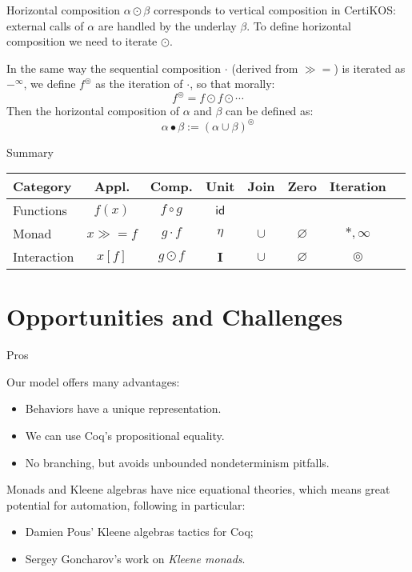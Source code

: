 \documentclass{beamer}
\newcommand{\bind}{\gg\!\!=}
\begin{document}
\begin{frame}{Horizontal composition} %
$\alpha \odot \beta$ corresponds to vertical composition in CertiKOS:
external calls of $\alpha$ are handled by the underlay $\beta$.
To define horizontal composition we need to iterate $\odot$.
\vfill

In the same way the sequential composition $\cdot$ (derived from $\bind$)
is iterated as $-^\infty$,
we define $f^\circledcirc$ as the iteration of $\cdot$,
so that morally:
\[
    f^\circledcirc = f \odot f \odot \cdots
\]
Then the horizontal composition of $\alpha$ and $\beta$
can be defined as:
\[ \alpha \bullet \beta := (\alpha \cup \beta)^\circledcirc \]
\vfill

\end{frame}

\begin{frame}{Summary} %

  \begin{center}
    \begin{tabular}{lccccccc}
      \hline
      Category & Appl. & Comp. & Unit & Join & Zero & Iteration \\
      \hline
      Functions & $f(x)$ & $f \circ g$ & $\mathsf{id}$ & & \\
      Monad &
        $x \bind f$ & $g \cdot f$ & $\eta$ &
        $\cup$ & $\varnothing$ & ${*}, {\infty}$ \\
      Interaction &
        $x[f]$ & $g \odot f$ & $\mathbf{I}$ &
        $\cup$ & $\varnothing$ & $\circledcirc$ \\
      \hline
    \end{tabular}
  \end{center}

\end{frame}

\section{Opportunities and Challenges}

\begin{frame}{Pros} %

Our model offers many advantages:
\begin{itemize}
\item Behaviors have a unique representation.
\item We can use Coq's propositional equality.
\item No branching, but avoids unbounded nondeterminism pitfalls.
\end{itemize}
\vfill

Monads and Kleene algebras
have nice equational theories,
which means great potential for automation,
following in particular:
\begin{itemize}
\item Damien Pous' Kleene algebras tactics for Coq;
\item Sergey Goncharov's work on \emph{Kleene monads}.
\end{itemize}
\vfill

\end{frame}
\end{document}
